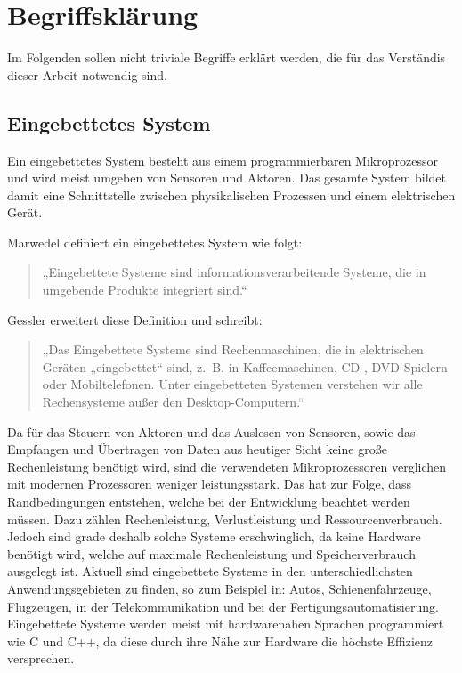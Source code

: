 \chapter{Begriffsklärung}
Im Folgenden sollen nicht triviale Begriffe erklärt werden, die für das Verständis dieser Arbeit notwendig sind.

\section{Eingebettetes System}
Ein eingebettetes System besteht aus einem programmierbaren Mikroprozessor und wird meist umgeben von Sensoren und Aktoren.
Das gesamte System bildet damit eine Schnittstelle zwischen physikalischen Prozessen und einem elektrischen Gerät.

Marwedel definiert ein eingebettetes System wie folgt:
\begin{quote}
    „Eingebettete Systeme sind informationsverarbeitende Systeme, die in umgebende Produkte integriert sind.“\cite{marwedelEingebetteteSystemeGrundlagen2021}
\end{quote}

Gessler erweitert diese Definition und schreibt:
\begin{quote}
    „Das Eingebettete Systeme sind Rechenmaschinen, die in elektrischen Geräten „eingebettet“ sind, z. B. in Kaffeemaschinen, CD-, DVD-Spielern oder Mobiltelefonen.
    Unter eingebetteten Systemen verstehen wir alle Rechensysteme außer den Desktop-Computern.“\cite{gesslerEntwicklungEingebetteterSysteme2014}
\end{quote}

Da für das Steuern von Aktoren und das Auslesen von Sensoren, sowie das Empfangen und Übertragen von Daten aus heutiger Sicht keine große Rechenleistung benötigt wird, sind die verwendeten Mikroprozessoren verglichen mit modernen Prozessoren weniger leistungsstark.
Das hat zur Folge, dass Randbedingungen entstehen, welche bei der Entwicklung beachtet werden müssen.
Dazu zählen Rechenleistung, Verlustleistung und Ressourcenverbrauch\cite{gesslerEntwicklungEingebetteterSysteme2014}.
Jedoch sind grade deshalb solche Systeme erschwinglich, da keine Hardware benötigt wird, welche auf maximale Rechenleistung und Speicherverbrauch ausgelegt ist.
Aktuell sind eingebettete Systeme in den unterschiedlichsten Anwendungsgebieten zu finden, so zum Beispiel in: Autos, Schienenfahrzeuge, Flugzeugen, in der Telekommunikation und bei der Fertigungsautomatisierung\cite{marwedelEingebetteteSystemeGrundlagen2021}.
Eingebettete Systeme werden meist mit hardwarenahen Sprachen programmiert wie C und C++, da diese durch ihre Nähe zur Hardware die höchste Effizienz versprechen\cite{gesslerEntwicklungEingebetteterSysteme2014}.

